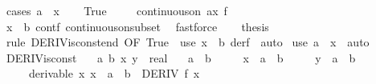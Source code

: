 \begin{isabellebody}
%
\endisadelimproof
%
\isatagproof
{}\isamarkupfalse%
\ {\isacharparenleft}{\kern0pt}cases\ {\isachardoublequoteopen}a\ {\isacharless}{\kern0pt}\ x{\isachardoublequoteclose}{\isacharparenright}{\kern0pt}\isanewline
\ \ \isamarkupfalse%
\ True\isanewline
\ \ \isamarkupfalse%
\ {\isacharasterisk}{\kern0pt}{\isacharcolon}{\kern0pt}\ {\isachardoublequoteopen}continuous{\isacharunderscore}{\kern0pt}on\ {\isacharbraceleft}{\kern0pt}a{\isachardot}{\kern0pt}{\isachardot}{\kern0pt}x{\isacharbraceright}{\kern0pt}\ f{\isachardoublequoteclose}\isanewline
\ \ \ \ \isamarkupfalse%
\ {\isacartoucheopen}x\ {\isasymle}\ b{\isacartoucheclose}\ contf\ continuous{\isacharunderscore}{\kern0pt}on{\isacharunderscore}{\kern0pt}subset\ \isamarkupfalse%
\ fastforce\isanewline
\ \ \isamarkupfalse%
\ {\isacharquery}{\kern0pt}thesis\isanewline
\ \ \ \ \isamarkupfalse%
\ {\isacharparenleft}{\kern0pt}rule\ DERIV{\isacharunderscore}{\kern0pt}isconst{\isacharunderscore}{\kern0pt}end\ {\isacharbrackleft}{\kern0pt}OF\ True\ {\isacharasterisk}{\kern0pt}{\isacharbrackright}{\kern0pt}{\isacharparenright}{\kern0pt}\ {\isacharparenleft}{\kern0pt}use\ {\isacartoucheopen}x\ {\isasymle}\ b{\isacartoucheclose}\ derf\ \ auto{\isacharparenright}{\kern0pt}\isanewline
{}\isamarkupfalse%
\ {\isacharparenleft}{\kern0pt}use\ {\isacartoucheopen}a\ {\isasymle}\ x{\isacartoucheclose}\ \ auto{\isacharparenright}{\kern0pt}%
\endisatagproof
{\isafoldproof}%
%
\isadelimproof
\isanewline
%
\endisadelimproof
\isanewline
{}\isamarkupfalse%
\ DERIV{\isacharunderscore}{\kern0pt}isconst{}{\isacharcolon}{\kern0pt}\isanewline
\ \ \ a\ b\ x\ y\ {\isacharcolon}{\kern0pt}{\isacharcolon}{\kern0pt}\ real\isanewline
\ \ \ {\isachardoublequoteopen}a\ {\isacharless}{\kern0pt}\ b{\isachardoublequoteclose}\isanewline
\ \ \ \ \ {\isachardoublequoteopen}x\ {\isasymin}\ {\isacharbraceleft}{\kern0pt}a\ {\isacharless}{\kern0pt}{\isachardot}{\kern0pt}{\isachardot}{\kern0pt}{\isacharless}{\kern0pt}\ b{\isacharbraceright}{\kern0pt}{\isachardoublequoteclose}\isanewline
\ \ \ \ \ {\isachardoublequoteopen}y\ {\isasymin}\ {\isacharbraceleft}{\kern0pt}a\ {\isacharless}{\kern0pt}{\isachardot}{\kern0pt}{\isachardot}{\kern0pt}{\isacharless}{\kern0pt}\ b{\isacharbraceright}{\kern0pt}{\isachardoublequoteclose}\isanewline
\ \ \ \ \ derivable{\isacharcolon}{\kern0pt}\ {\isachardoublequoteopen}{\isasymAnd}x{\isachardot}{\kern0pt}\ x\ {\isasymin}\ {\isacharbraceleft}{\kern0pt}a\ {\isacharless}{\kern0pt}{\isachardot}{\kern0pt}{\isachardot}{\kern0pt}{\isacharless}{\kern0pt}\ b{\isacharbraceright}{\kern0pt}\ {\isasymLongrightarrow}\ DERIV\ f\ x\ {\isacharcolon}{\kern0pt}{\isachargreater}{\kern0pt}\ {}{\isachardoublequoteclose}\isanewline

\end{isabellebody}
